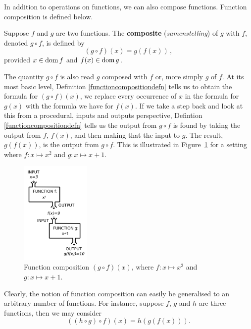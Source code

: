 In addition to operations on functions, we can also compose functions. Function composition is defined below.
\begin{definition}
\label{functioncompositiondefn} Suppose $f$ and $g$ are two functions.  The \textbf{composite} (\textit{samenstelling}) of $g$ with $f$, denoted $g \circ f$, is defined by
 $$
(g \circ f) (x) = g(f(x))\,,
$$
provided $x\in\text{dom}{\,}f$  and $f(x)\in\text{dom}{\,} g$. 
\end{definition}
The quantity $g \circ f$ is also read $g$ composed with $f$ or, more simply $g$ of $f$. At its most basic level, Definition \ref{functioncompositiondefn} tells us to obtain the formula for $\left(g \circ f\right)(x)$, we replace every occurrence of $x$ in the formula for $g(x)$ with the formula we have for $f(x)$.  If we take a step back and look at this from a procedural, inputs and outputs perspective, Defintion \ref{functioncompositiondefn} tells us  the output from $g \circ f$ is found by taking the output from $f$, $f(x)$,  and then making that the input to $g$.  The result, $g(f(x))$, is the output from $g \circ f$. This is illustrated in Figure~\ref{fig_functions_13} for a setting where $f:x\mapsto x^2$ and $g:x\mapsto x+1$. 
\begin{figure}
	\begin{center}
	\includegraphics[width=0.3\textwidth]{fig_functions_13}
	\caption{Function composition $(g\circ f)(x)$, where $f:x\mapsto x^2$ and $g:x\mapsto x+1$.}
	\label{fig_functions_13}
	\end{center}
\end{figure}
Clearly, the notion of function composition can easily be generalised to an arbitrary number of functions. For instance,  suppose $f$, $g$ and $h$ are three functions, then we may consider 
$$\left(\left(h \circ g\right) \circ f\right)(x) = h\left(g\left(f\left(x\right)\right)\right).$$




